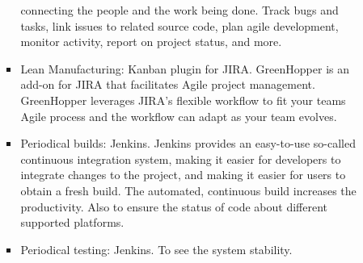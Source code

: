 \begin{itemize}
\begin{itemize}
\begin{itemize}
					connecting the people and the work being done. Track bugs and tasks, link issues to related source code, 
					plan agile development, monitor activity, report on project status, and more. 
				\item Lean Manufacturing: Kanban plugin for JIRA. GreenHopper is an add-on for JIRA that facilitates Agile project management. 
					GreenHopper leverages JIRA's flexible workflow to fit your teams Agile process and the workflow can adapt as your team evolves.
				\item Periodical builds: Jenkins. Jenkins provides an easy-to-use so-called continuous integration system, making it easier 
					for developers to integrate changes to the project, and making it easier for users to obtain a fresh build. The automated, 
					continuous build increases the productivity. Also to ensure the status of code about different supported platforms.
				\item Periodical testing: Jenkins. To see the system stability.
			\end{itemize}
		\end{itemize}
\end{itemize}





